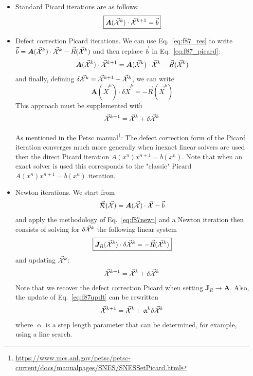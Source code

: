 \begin{itemize}
\item Standard Picard iterations are as follows:
\begin{equation}
\boxed{
{\bm A}(\vec{\cal X}^k) \cdot \vec{\cal X}^{k+1} = \vec{b} \label{eq:f87_picard}
}
\end{equation}

\item Defect correction Picard iterations. We can use Eq.~\eqref{eq:f87_res} to write 
$\vec{b} = {\bm A}(\vec{\cal X}^k)\cdot \vec{\cal X}^k  -\vec{R}(\vec{\cal X}^k)$
and then replace $\vec{b}$ in Eq.~\eqref{eq:f87_picard}:
\begin{equation}
{\bm A}(\vec{\cal X}^k) \cdot \vec{\cal X}^{k+1} 
= {\bm A}(\vec{\cal X}^k)\cdot \vec{\cal X}^k -\vec{R}(\vec{\cal X}^k)
\end{equation}
and finally, defining $\delta\vec{\cal X}^{k} = \vec{\cal X}^{k+1} -\vec{\cal X}^{k}$, 
we can write 
\[
\boxed{
{\bm A}(\vec{X}^k) \cdot \delta \vec{X}^{k} = -\vec{R}(\vec{X}^k)
}
\]
This approach must be supplemented with 
\[
\vec{\cal X}^{k+1} = \vec{\cal X}^k + \delta \vec{\cal X}^{k} 
\]

\begin{remark}
As mentioned in the Petsc manual\footnote{\url{https://www.mcs.anl.gov/petsc/petsc-current/docs/manualpages/SNES/SNESSetPicard.html}}:
The defect correction form of the Picard iteration converges much more generally when inexact linear solvers are used 
then the direct Picard iteration $A(x^n) x^{n+1} = b(x^n)$.  Note that when an exact solver is used this corresponds to the "classic" 
Picard $A(x^{n}) x^{n+1} = b(x^{n})$ iteration. 
\end{remark}


\item Newton iterations. We start from 
\[
\vec{\cal R}(\vec{\cal X}) = {\bm A}(\vec{\cal X})\cdot \vec{\cal X} - \vec{b} 
\]
and apply the methodology of Eq.~\eqref{eq:f87newt} 
and a Newton iteration then consists of solving 
for $\delta \vec{\cal X}^{k}$ the following linear system  
\[
\boxed{
{\bm J}_R(\vec{\cal X}^k) \cdot \delta \vec{\cal X}^{k} = -\vec{R}(\vec{\cal X}^k)
}
\]
and updating $\vec{\cal X}^k$:
\begin{equation}
\vec{\cal X}^{k+1} = \vec{\cal X}^k + \delta \vec{\cal X}^{k} 
\label{eq:f87updt}
\end{equation}
Note that we recover the defect correction Picard when setting ${\bm J}_R \rightarrow {\bm A}$.
Also, the update of Eq.~\eqref{eq:f87updt} can be rewritten
\[
\vec{\cal X}^{k+1} = \vec{\cal X}^k + \upalpha^k \delta \vec{\cal X}^{k} 
\]
where $\upalpha$ is a step length parameter that can be determined, for example, using
a line search.



\end{itemize}
